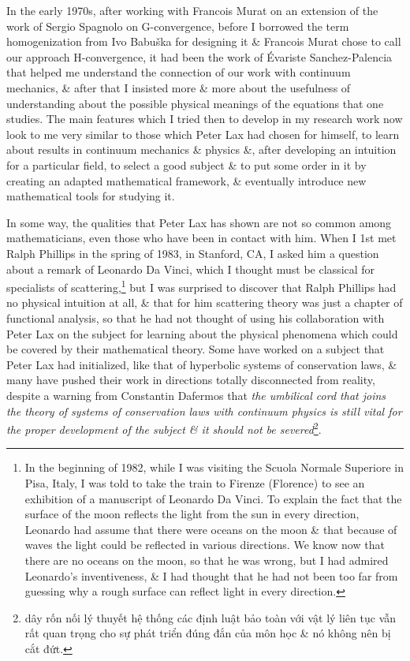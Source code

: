\documentclass{article}
\begin{document}
\begin{enumerate}
	In the early 1970s, after working with {\sc Francois Murat} on an extension of the work of {\sc Sergio Spagnolo} on G-convergence, before I borrowed the term homogenization from {\sc Ivo Babu\v{s}ka} for designing it \& {\sc Francois Murat} chose to call our approach H-convergence, it had been the work of {\sc\'Evariste Sanchez-Palencia} that helped me understand the connection of our work with continuum mechanics, \& after that I insisted more \& more about the usefulness of understanding about the possible physical meanings of the equations that one studies. The main features which I tried then to develop in my research work now look to me very similar to those which {\sc Peter Lax} had chosen for himself, to learn about results in continuum mechanics \& physics \&, after developing an intuition for a particular field, to select a good subject \& to put some order in it by creating an adapted mathematical framework, \& eventually introduce new mathematical tools for studying it.
	
	In some way, the qualities that {\sc Peter Lax} has shown are not so common among mathematicians, even those who have been in contact with him. When I 1st met {\sc Ralph Phillips} in the spring of 1983, in Stanford, CA, I asked him a question about a remark of {\sc Leonardo Da Vinci}, which I thought must be classical for specialists of scattering,\footnote{In the beginning of 1982, while I was visiting the Scuola Normale Superiore in Pisa, Italy, I was told to take the train to Firenze (Florence) to see an exhibition of a manuscript of {\sc Leonardo Da Vinci}. To explain the fact that the surface of the moon reflects the light from the sun in every direction, {\sc Leonardo} had assume that there were oceans on the moon \& that because of waves the light could be reflected in various directions. We know now that there are no oceans on the moon, so that he was wrong, but I had admired {\sc Leonardo}'s inventiveness, \& I had thought that he had not been too far from guessing why a rough surface can reflect light in every direction.} but I was surprised to discover that {\sc Ralph Phillips} had no physical intuition at all, \& that for him scattering theory was just a chapter of functional analysis, so that he had not thought of using his collaboration with {\sc Peter Lax} on the subject for learning about the physical phenomena which could be covered by their mathematical theory. Some have worked on a subject that {\sc Peter Lax} had initialized, like that of hyperbolic systems of conservation laws, \& many have pushed their work in directions totally disconnected from reality, despite a warning from {\sc Constantin Dafermos} that {\it the umbilical cord that joins the theory of systems of conservation laws with continuum physics is still vital for the proper development of the subject \& it should not be severed}\footnote{dây rốn nối lý thuyết hệ thống các định luật bảo toàn với vật lý liên tục vẫn rất quan trọng cho sự phát triển đúng đắn của môn học \& nó không nên bị cắt đứt.}.
	

\end{enumerate}
\end{document}
